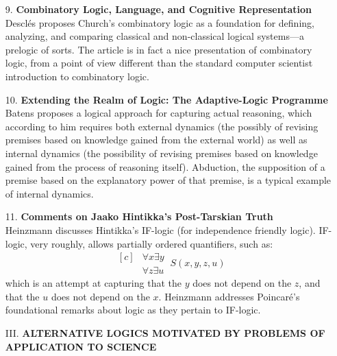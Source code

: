 \documentclass[11pt]{article}
\newcommand{\<}{\langle}
\renewcommand{\>}{\rangle}
\begin{document}
\begin{itemize}
\item[9.] \textbf{Combinatory Logic, Language, and Cognitive
Representation}\\
Descl\'es proposes Church's combinatory logic as a foundation
for defining, analyzing, and comparing classical and non-classical
logical systems---a prelogic of sorts. 
The article is in fact a nice presentation of combinatory logic,
from a point of view different than the standard computer scientist
introduction to combinatory logic. 

\item[10.] \textbf{Extending the Realm of Logic: The Adaptive-Logic
Programme}\\
Batens proposes a logical approach for capturing actual reasoning,
which according to him requires both external dynamics (the possibly
of revising premises based on knowledge gained from the external
world) as well as internal dynamics (the possibility of revising
premises based on knowledge gained from the process of reasoning
itself). Abduction, the supposition of a premise based on the
explanatory power of that premise, is a typical example of internal
dynamics. 

\item[11.] \textbf{Comments on Jaako Hintikka's Post-Tarskian Truth}\\
Heinzmann
discusses Hintikka's IF-logic (for independence friendly
logic). IF-logic, very roughly, allows partially ordered quantifiers,
such as:
\[ \begin{aligned}[c]
    & \forall x\exists y\\
    & \forall z\exists u
   \end{aligned} ~S(x,y,z,u)
\]
which is an attempt at capturing  that the $y$ does not depend on the $z$, and
that the $u$ does not depend on the $x$. 
Heinzmann addresses Poincar\'e's foundational remarks about logic as
they pertain to IF-logic.

\item[III.] \textbf{ALTERNATIVE LOGICS MOTIVATED BY PROBLEMS OF
APPLICATION TO SCIENCE}


\end{itemize}
\end{document}
